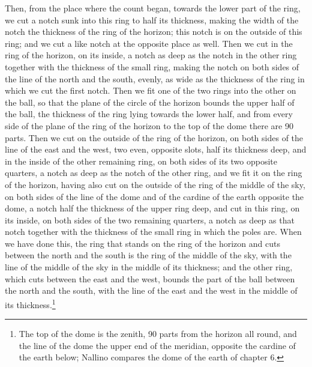 \documentclass[11pt]{article}
\newcommand{\ArPage}[1]{\marginpar{\footnotesize\color{gray}Ar.\,p.\,#1}}
\begin{document}
\par \ArPage{213}Then, from the place where the count began, towards the lower part of the ring, we cut a notch sunk into this ring to half its thickness, making the width of the notch the thickness of the ring of the horizon; this notch is on the outside of this ring; and we cut a like notch at the opposite place as well. Then we cut in the ring of the horizon, on its inside, a notch as deep as the notch in the other ring together with the thickness of the small ring, making the notch on both sides of the line of the north and the south, evenly, as wide as the thickness of the ring in which we cut the first notch. Then we fit one of the two rings into the other on the ball, so that the plane of the circle of the horizon bounds the upper half of the ball, the thickness of the ring lying towards the lower half, and from every side of the plane of the ring of the horizon to the top of the dome there are 90 parts. Then we cut on the outside of the ring of the horizon, on both sides of the line of the east and the west, two even, opposite slots, half its thickness deep, and in the inside of the other remaining ring, on both sides of its two opposite quarters, a notch as deep as the notch of the other ring, and we fit it on the ring of the horizon, having also cut on the outside of the ring of the middle of the sky, on both sides of the line of the dome and of the cardine of the earth opposite the dome, a notch half the thickness of the upper ring deep, and cut in this ring, on its inside, on both sides of the two remaining quarters, a notch as deep as that notch together with the thickness of the small ring in which the poles are. When we have done this, the ring that stands on the ring of the horizon and cuts between the north and the south is the ring of the middle of the sky, with the line of the middle of the sky in the middle of its thickness; and the other ring, which cuts between the east and the west, bounds the part of the ball between the north and the south, with the line of the east and the west in the middle of its thickness.\footnote{The top of the dome is the zenith, 90 parts from the horizon all round, and the line of the dome the upper end of the meridian, opposite the cardine of the earth below; Nallino compares the dome of the earth of chapter 6.}\par
\end{document}
